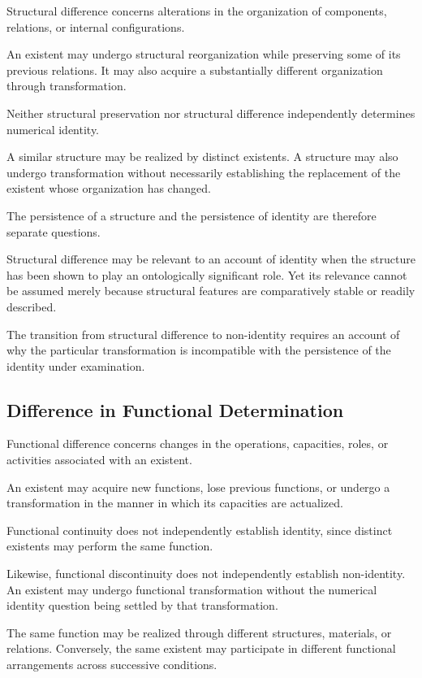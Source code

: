 Structural difference concerns alterations in the
organization of components, relations, or internal
configurations.

An existent may undergo structural reorganization
while preserving some of its previous relations.
It may also acquire a substantially different
organization through transformation.

Neither structural preservation nor structural
difference independently determines numerical identity.

A similar structure may be realized by distinct
existents. A structure may also undergo transformation
without necessarily establishing the replacement
of the existent whose organization has changed.

The persistence of a structure and the persistence
of identity are therefore separate questions.

Structural difference may be relevant to an account
of identity when the structure has been shown to
play an ontologically significant role. Yet its
relevance cannot be assumed merely because structural
features are comparatively stable or readily described.

The transition from structural difference to
non-identity requires an account of why the particular
transformation is incompatible with the persistence
of the identity under examination.

\subsection{Difference in Functional Determination}

Functional difference concerns changes in the
operations, capacities, roles, or activities associated
with an existent.

An existent may acquire new functions, lose previous
functions, or undergo a transformation in the manner
in which its capacities are actualized.

Functional continuity does not independently establish
identity, since distinct existents may perform the
same function.

Likewise, functional discontinuity does not independently
establish non-identity. An existent may undergo
functional transformation without the numerical
identity question being settled by that transformation.

The same function may be realized through different
structures, materials, or relations. Conversely,
the same existent may participate in different
functional arrangements across successive conditions.

